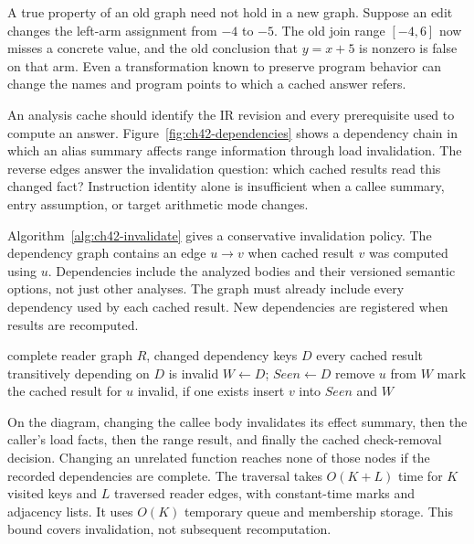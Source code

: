 A true property of an old graph need not hold in a new graph.
Suppose an edit changes the left-arm assignment from $-4$ to $-5$.
The old join range $[-4,6]$ now misses a concrete value, and the old conclusion that $y=x+5$ is nonzero is false on that arm.
Even a transformation known to preserve program behavior can change the names and program points to which a cached answer refers.

An analysis cache should identify the IR revision and every prerequisite used to compute an answer.
Figure~\ref{fig:ch42-dependencies} shows a dependency chain in which an alias summary affects range information through load invalidation.
The reverse edges answer the invalidation question: which cached results read this changed fact?
Instruction identity alone is insufficient when a callee summary, entry assumption, or target arithmetic mode changes.



Algorithm~\ref{alg:ch42-invalidate} gives a conservative invalidation policy.
The dependency graph contains an edge $u\to v$ when cached result $v$ was computed using $u$.
Dependencies include the analyzed bodies and their versioned semantic options, not just other analyses.
The graph must already include every dependency used by each cached result.
New dependencies are registered when results are recomputed.

\begin{algorithm}
\caption{Invalidate the transitive readers of changed dependencies.}
\label{alg:ch42-invalidate}
\begin{pseudocode}
\Require complete reader graph $R$, changed dependency keys $D$
\Ensure every cached result transitively depending on $D$ is invalid
\State $W\gets D$; $Seen\gets D$
  \State remove $u$ from $W$
  \State mark the cached result for $u$ invalid, if one exists
      \State insert $v$ into $Seen$ and $W$
    \EndIf
  \EndFor
\EndWhile
\end{pseudocode}
\end{algorithm}

On the diagram, changing the callee body invalidates its effect summary, then the caller's load facts, then the range result, and finally the cached check-removal decision.
Changing an unrelated function reaches none of those nodes if the recorded dependencies are complete.
The traversal takes $O(K+L)$ time for $K$ visited keys and $L$ traversed reader edges, with constant-time marks and adjacency lists.
It uses $O(K)$ temporary queue and membership storage.
This bound covers invalidation, not subsequent recomputation.

